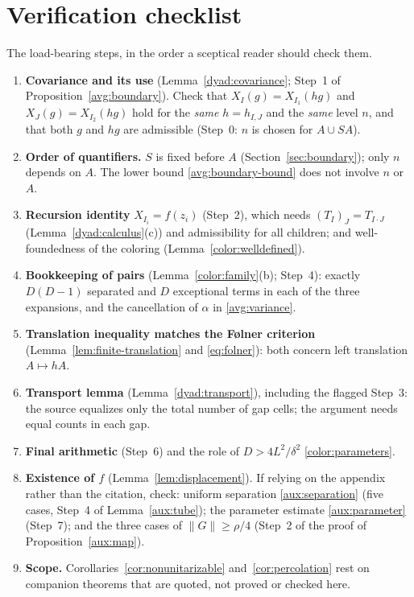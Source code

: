 \documentclass[11pt]{article}
\newcommand{\norm}[1]{\lVert #1\rVert}
\theoremstyle{definition}
\numberwithin{equation}{section}
\begin{document}
\section*{Verification checklist}

The load-bearing steps, in the order a sceptical reader should check them.
\begin{enumerate}
\item \textbf{Covariance and its use} (Lemma~\ref{dyad:covariance};
Step~1 of Proposition~\ref{avg:boundary}). Check that
\(X_I(g)=X_{I_1}(hg)\) and \(X_J(g)=X_{I_2}(hg)\) hold for the \emph{same}
\(h=h_{I,J}\) and the \emph{same} level \(n\), and that both \(g\) and
\(hg\) are admissible (Step~0: \(n\) is chosen for \(A\cup SA\)).
\item \textbf{Order of quantifiers.} \(S\) is fixed before \(A\)
(Section~\ref{sec:boundary}); only \(n\) depends on \(A\). The lower bound
\eqref{avg:boundary-bound} does not involve \(n\) or \(A\).
\item \textbf{Recursion identity} \(X_{I_i}=f(z_i)\) (Step~2), which
needs \((T_I)_J=T_{I\cdot J}\) (Lemma~\ref{dyad:calculus}(c)) and
admissibility for all children; and well-foundedness of the coloring
(Lemma~\ref{color:welldefined}).
\item \textbf{Bookkeeping of pairs} (Lemma~\ref{color:family}(b);
Step~4): exactly \(D(D-1)\) separated and \(D\) exceptional terms in each
of the three expansions, and the cancellation of \(\alpha\) in
\eqref{avg:variance}.
\item \textbf{Translation inequality matches the F\o lner criterion}
(Lemma~\ref{lem:finite-translation} and \eqref{eq:folner}): both concern
left translation \(A\mapsto hA\).
\item \textbf{Transport lemma} (Lemma~\ref{dyad:transport}), including
the flagged Step~3: the source equalizes only the total number of gap
cells; the argument needs equal counts in each gap.
\item \textbf{Final arithmetic} (Step~6) and the role of
\(D>4L^2/\delta^2\) \eqref{color:parameters}.
\item \textbf{Existence of \(f\)} (Lemma~\ref{lem:displacement}). If
relying on the appendix rather than the citation, check: uniform
separation \eqref{aux:separation} (five cases, Step~4 of
Lemma~\ref{aux:tube}); the parameter estimate \eqref{aux:parameter}
(Step~7); and the three cases of \(\norm{G}\ge\rho/4\) (Step~2 of the
proof of Proposition~\ref{aux:map}).
\item \textbf{Scope.} Corollaries~\ref{cor:nonunitarizable}
and~\ref{cor:percolation} rest on companion theorems that are quoted, not
proved or checked here.
\end{enumerate}



\end{document}
